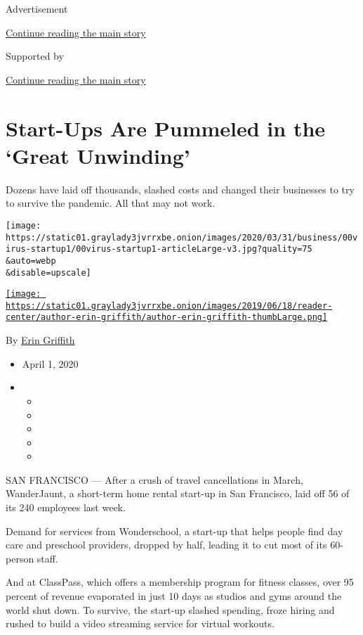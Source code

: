 Advertisement

\protect\hyperlink{after-top}{Continue reading the main story}

Supported by

\protect\hyperlink{after-sponsor}{Continue reading the main story}

\hypertarget{start-ups-are-pummeled-in-the-great-unwinding}{%
\section{Start-Ups Are Pummeled in the `Great
Unwinding'}\label{start-ups-are-pummeled-in-the-great-unwinding}}

Dozens have laid off thousands, slashed costs and changed their
businesses to try to survive the pandemic. All that may not work.

\texttt{[image: https://static01.graylady3jvrrxbe.onion/images/2020/03/31/business/00virus-startup1/00virus-startup1-articleLarge-v3.jpg?quality=75\\\&auto=webp\\\&disable=upscale]}

\href{https://www.nytimes3xbfgragh.onion/by/erin-griffith}{\texttt{[image: https://static01.graylady3jvrrxbe.onion/images/2019/06/18/reader-center/author-erin-griffith/author-erin-griffith-thumbLarge.png]}}

By \href{https://www.nytimes3xbfgragh.onion/by/erin-griffith}{Erin
Griffith}

\begin{itemize}
\item
  April 1, 2020
\item
  \begin{itemize}
  \item
  \item
  \item
  \item
  \item
  \end{itemize}
\end{itemize}

SAN FRANCISCO --- After a crush of travel cancellations in March,
WanderJaunt, a short-term home rental start-up in San Francisco, laid
off 56 of its 240 employees last week.

Demand for services from Wonderschool, a start-up that helps people find
day care and preschool providers, dropped by half, leading it to cut
most of its 60-person staff.

And at ClassPass, which offers a membership program for fitness classes,
over 95 percent of revenue evaporated in just 10 days as studios and
gyms around the world shut down. To survive, the start-up slashed
spending, froze hiring and rushed to build a video streaming service for
virtual workouts.

